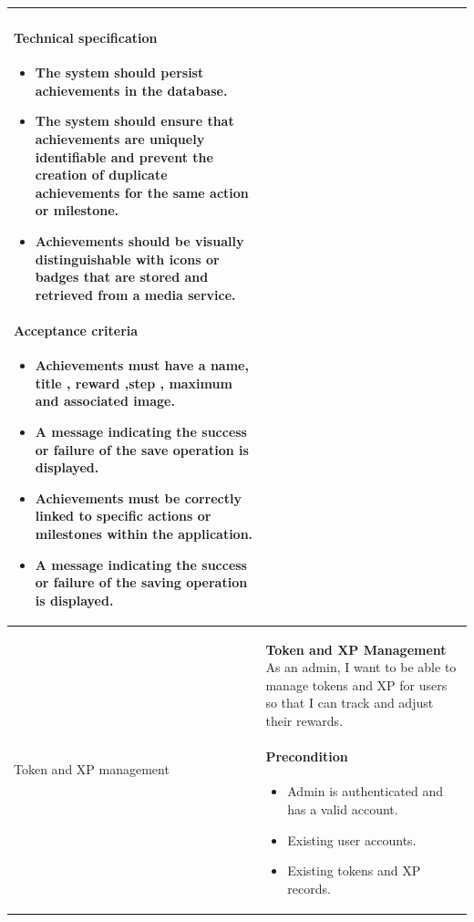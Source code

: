 \begin{longtable}{ | m{} | m{} | }
\begin{itemize}
    \end{itemize}
    \paragraph*{Technical specification} \mbox{} \newline
    \begin{itemize}
        \item The system should persist achievements in the database.
        \item The system should ensure that achievements are uniquely identifiable and prevent the creation of duplicate achievements for the same action or milestone.
        \item Achievements should be visually distinguishable with icons or badges that are stored and retrieved from a media service.

    \end{itemize}
    \paragraph*{Acceptance criteria} \mbox{} \newline
    \begin{itemize}
        \item Achievements must have a name, title , reward ,step , maximum	 and associated image.
        \item A message indicating the success or failure of the save operation is displayed.
        \item Achievements must be correctly linked to specific actions or milestones within the application.
        \item A message indicating the success or failure of the saving operation is displayed.
    \end{itemize}                                                                                                                                    \\
    \hline
    Token and XP  \newline management  & \textbf{Token and XP Management} \newline As an admin, I want to be able to manage tokens and XP for users so that I can track and adjust their rewards.

    \paragraph*{Precondition} \mbox{} \newline
    \begin{itemize}
        \item Admin is authenticated and has a valid account.
        \item Existing user accounts.
        \item Existing tokens and XP records.
    \end{itemize}
    

\end{longtable}
